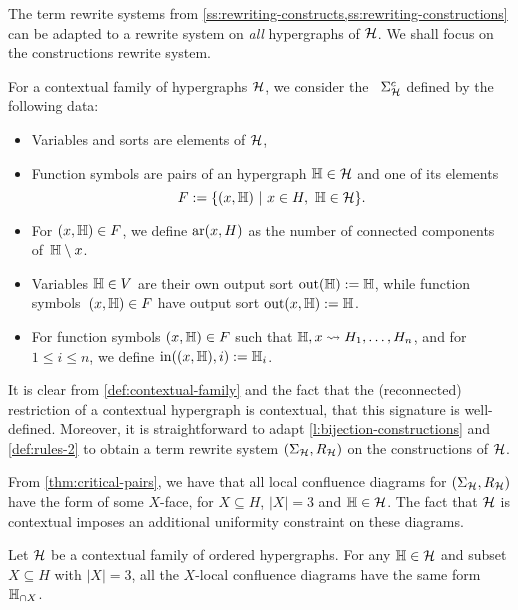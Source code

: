 The term rewrite systems from \cref{ss:rewriting-constructs,ss:rewriting-constructions} can be adapted to a rewrite system on \emph{all} hypergraphs of $\mathcal{H}$.
We shall focus on the constructions rewrite system. 

\begin{definition}
  For a contextual family of hypergraphs $\mathcal{H}$, we consider the ~$\Sigma_{\mathcal{H}}^c$ defined by the following data:
  \begin{itemize}
    \item Variables and sorts are elements of $\mathcal{H}$, 
    \item Function symbols are pairs of an hypergraph ${\mathbb H} \in \mathcal{H}$ and one of its elements 
    $$F:=\{(x,\hyper{H}) \ | \ x \in H, \ \hyper{H} \in \calH \}.$$
    \item For $(x,{\mathbb H}) \in F$, we define $\mathrm{ar}(x,H)$ as the number of connected components of~${\mathbb H} \setminus {x}$.
    \item Variables ${\mathbb H} \in V$ are their own output sort $\operatorname{out}({\mathbb H}):={\mathbb H}$, while function symbols~$(x,{\mathbb H}) \in F$ have output sort $\operatorname{out}(x,{\mathbb H}):={\mathbb H}$.
    \item For function symbols $(x,{\mathbb H}) \in F$ such that ${\mathbb H},x \leadsto H_1,\ldots,H_n$, and for $1 \leq i \leq n$, we define $\operatorname{in}((x,{\mathbb H}),i):={\mathbb H}_i$.
  \end{itemize}
\end{definition}

It is clear from \cref{def:contextual-family} and the fact that the (reconnected) restriction of a contextual hypergraph is contextual, that this signature is well-defined.
Moreover, it is straightforward to adapt \cref{l:bijection-constructions} and \cref{def:rules-2} to obtain a term rewrite system $(\Sigma_{\mathcal{H}},R_{\mathcal{H}})$ on the constructions of $\mathcal{H}$. 

From \cref{thm:critical-pairs}, we have that all local confluence diagrams for $(\Sigma_{\mathcal{H}},R_{\mathcal{H}})$ have the form of some $X$-face, for $X \subseteq H$, $|X|=3$ and ${\mathbb H} \in \mathcal{H}$. 
The fact that $\mathcal{H}$ is contextual imposes an additional uniformity constraint on these diagrams.

\begin{thm} 
Let $\mathcal{H}$ be a contextual family of ordered hypergraphs.
For any ${\mathbb H} \in \mathcal{H}$ and subset $X \subseteq H$ with $|X|=3$, all the $X$-local confluence diagrams have the same form ${\mathbb H}_{\cap X}$. 
\end{thm}

